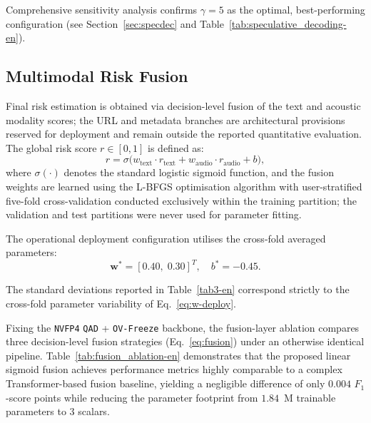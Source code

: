 \documentclass[a4paper,fleqn]{cas-sc}
\begin{document}
Comprehensive sensitivity analysis confirms $\gamma = 5$ as the optimal, best-performing configuration (see Section~\ref{sec:specdec} and Table~\ref{tab:speculative_decoding-en}).

\subsection{Multimodal Risk Fusion}

Final risk estimation is obtained via decision-level fusion of the text and acoustic modality scores; the URL and metadata branches are architectural provisions reserved for deployment and remain outside the reported quantitative evaluation. The global risk score $r \in [0, 1]$ is defined as:
\begin{equation}
\label{eq:fusion}
r = \sigma\bigl(w_{\mathrm{text}}\cdot r_{\mathrm{text}}
+ w_{\mathrm{audio}}\cdot r_{\mathrm{audio}} + b\bigr),
\end{equation}
where $\sigma(\cdot)$ denotes the standard logistic sigmoid function, and the fusion weights are learned using the L-BFGS optimisation algorithm with user-stratified five-fold cross-validation conducted exclusively within the training partition; the validation and test partitions were never used for parameter fitting.

The operational deployment configuration utilises the cross-fold averaged parameters:
\begin{equation}
\label{eq:w-deploy}
\mathbf{w}^{*} = [0.40,\; 0.30]^{T}, \quad b^{*} = -0.45.
\end{equation}

The standard deviations reported in Table~\ref{tab3-en} correspond strictly to the cross-fold parameter variability of Eq.~\eqref{eq:w-deploy}.

Fixing the \texttt{NVFP4} \texttt{QAD} + \texttt{OV-Freeze} backbone, the fusion-layer ablation compares three decision-level fusion strategies (Eq.~\eqref{eq:fusion}) under an otherwise identical pipeline. Table~\ref{tab:fusion_ablation-en} demonstrates that the proposed linear sigmoid fusion achieves performance metrics highly comparable to a complex Transformer-based fusion baseline, yielding a negligible difference of only $0.004$ $F_1$-score points while reducing the parameter footprint from $1.84$~M trainable parameters to $3$ scalars.
\end{document}
